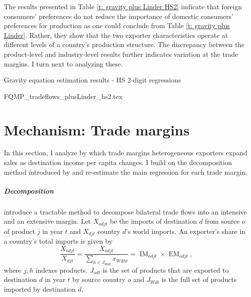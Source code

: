 \documentclass[12pt,a4paper,oneside,times]{article}   	%
\newcommand{\tablespath}{{"C:/Users/dhill/Dropbox/Dissertation"}}
\DeclareMathOperator{\IM}{IM}
\DeclareMathOperator{\EM}{EM}
\begin{document}
The results presented in Table \ref{t: gravity plus Linder HS2} indicate that foreign consumers' preferences do not reduce the importance of domestic consumers' preferences for production as one could conclude from Table \ref{t: gravity plus Linder}. Rather, they show that the two exporter characteristics operate at different levels of a country's production structure. The discrepancy between the product-level and industry-level results further indicates variation at the trade margins. I turn next to analyzing these.   

\begin{table}[htbp]\centering
\caption{Gravity equation estimation results - HS 2-digit regressions \label{t: gravity plus Linder HS2}}
{FQMP_tradeflows_plusLinder_hs2.tex}
\end{table}





\section{Mechanism: Trade margins}\label{s: results decomp}

In this section, I analyze by which trade margins heterogeneous exporters expand sales as destination income per capita changes. I build on the decomposition method introduced by \cite{Hummels2005} and re-estimate the main regression for each trade margin. 

\subparagraph{Decomposition}

\cite{Hummels2005} introduce a tractable method to decompose bilateral trade flows into an intensive and an extensive margin. Let $X_{odjt}$ be the imports of destination $d$ from source $o$ of product $j$ in year $t$ and $X_{djt}$ country $d$'s world imports. An exporter's share in a country's total imports is given by
\begin{equation}
\frac{X_{odjt}}{X_{djt}} = \frac{ X_{odjt}}{\sum_{h \in J_{Wdt}} x_{Wdht}} = \IM_{odjt} \times \EM_{odjt},
\end{equation}
where $j,h$ indexes products. $J_{odt}$ is the set of products that are exported to destination $d$ in year $t$ by source country $o$ and $J_{Wdt}$ is the full set of products imported by destination $d$.
\end{document}
